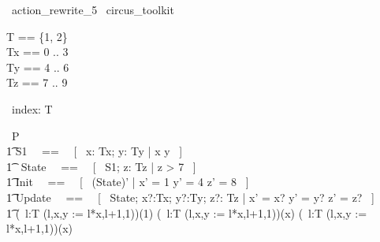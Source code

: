 % 
\begin{zsection}
  \SECTION\ action\_rewrite\_5 \parents\ circus\_toolkit
\end{zsection}

\begin{zed}
    T == \{1, 2\} \\
	Tx == 0 .. 3 \\ 
	Ty == 4 .. 6 \\ 
	Tz == 7 .. 9 \\ 
\end{zed}

\begin{circus}
	\circchannel\ index: T \\
\end{circus}

\begin{circus}
    \circprocess\ P \circdef \circbegin \\
        \t1 S1 ~~==~~ [~  x: Tx; y: Ty | x  \land y  ~] \\
        \t1 \circstate\ State ~~==~~ [~ S1; z: Tz | z > 7 ~] \\
        \t1 Init ~~==~~ [~ (State)' | x' = 1 \land y' = 4 \land z' = 8 ~] \\
        \t1 Update ~~==~~ [~ \Delta State; x?:Tx; y?:Ty; z?: Tz | x' = x? \land y' = y? \land z' = z? ~] \\
        \t1 \circspot (\circval\ l:T \circspot (l,x,y := l*x,l+1,1))(1) \extchoice 
            (\circres\ l:T \circspot (l,x,y := l*x,l+1,1))(x) \extchoice 
            (\circvres\ l:T \circspot (l,x,y := l*x,l+1,1))(x) \\ 
	\circend
\end{circus}

